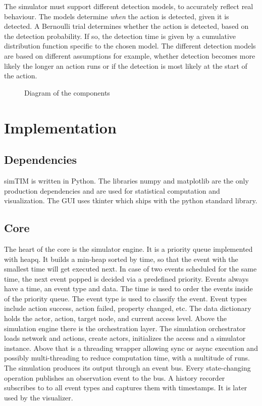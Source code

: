 \documentclass{llncs}
\begin{document}
The simulator must support different detection models, to accurately reflect real behaviour. The models determine \emph{when} the action is detected, given it is detected. A Bernoulli trial determines whether the action is detected, based on the detection probability. If so, the detection time is given by a cumulative distribution function specific to the chosen model. The different detection models are based on different assumptions for example, whether detection becomes more likely the longer an action runs or if the detection is most likely at the start of the action.

\begin{figure}[!h]
    \centering
    
    \caption{Diagram of the components}
    \label{fig:component_diagram}
\end{figure}


\section{Implementation}
\subsection{Dependencies}
simTIM is written in Python. The libraries numpy and matplotlib are the only production dependencies and are used for statistical computation and visualization. The GUI uses tkinter which ships with the python standard library.
\subsection{Core}
The heart of the core is the simulator engine. It is a priority queue implemented with heapq. It builds a min-heap sorted by time, so that the event with the smallest time will get executed next. In case of two events scheduled for the same time, the next event popped is decided via a predefined priority.
Events always have a time, an event type and data.
The time is used to order the events inside of the priority queue. The event type is used to classify the event. Event types include action success, action failed, property changed, etc. The data dictionary holds the actor, action, target node, and current access level.
Above the simulation engine there is the orchestration layer. The simulation orchestrator loads network and actions, create actors, initializes the access and a simulator instance.
Above that is a threading wrapper allowing sync or async execution and possibly multi-threading to reduce computation time, with a multitude of runs.
The simulation produces its output through an event bus. Every state-changing operation publishes an observation event to the bus. A history recorder subscribes to to all event types and captures them with timestamps. It is later used by the visualizer.
\end{document}
